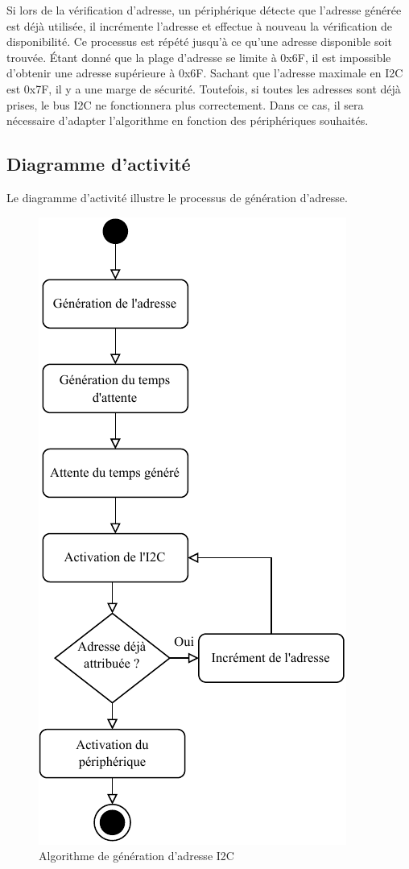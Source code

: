 Si lors de la vérification d'adresse, un périphérique détecte que l'adresse générée est déjà utilisée, il incrémente l'adresse et effectue à nouveau la vérification de disponibilité.
Ce processus est répété jusqu'à ce qu'une adresse disponible soit trouvée.
Étant donné que la plage d'adresse se limite à 0x6F, il est impossible d'obtenir une adresse supérieure à 0x6F.
Sachant que l'adresse maximale en I2C est 0x7F, il y a une marge de sécurité.
Toutefois, si toutes les adresses sont déjà prises, le bus I2C ne fonctionnera plus correctement.
Dans ce cas, il sera nécessaire d'adapter l'algorithme en fonction des périphériques souhaités.

\newpage
\subsection{Diagramme d'activité}

Le diagramme d'activité illustre le processus de génération d'adresse.

\begin{figure}[H]
    \centering
    \includegraphics[scale=1.3]{./assets/figures/gen_addr.pdf}
    \caption{Algorithme de génération d'adresse I2C}
\end{figure}

